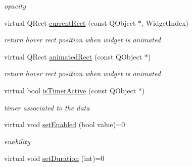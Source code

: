 \begin{DoxyCompactItemize}
\begin{DoxyCompactList}\small\item\em opacity \end{DoxyCompactList}\item 
\mbox{\label{class_menu_base_engine_a678b422c4319b1037f5470cdd4412bcd}} 
virtual Q\+Rect \hyperlink{class_menu_base_engine_a678b422c4319b1037f5470cdd4412bcd}{current\+Rect} (const Q\+Object $\ast$, Widget\+Index)
\begin{DoxyCompactList}\small\item\em return \textquotesingle{}hover\textquotesingle{} rect position when widget is animated \end{DoxyCompactList}\item 
\mbox{\label{class_menu_base_engine_a60d4f198d6c96f5233095996d6f1b3ef}} 
virtual Q\+Rect \hyperlink{class_menu_base_engine_a60d4f198d6c96f5233095996d6f1b3ef}{animated\+Rect} (const Q\+Object $\ast$)
\begin{DoxyCompactList}\small\item\em return \textquotesingle{}hover\textquotesingle{} rect position when widget is animated \end{DoxyCompactList}\item 
\mbox{\label{class_menu_base_engine_a6b93aaade5dadbedc68951940e3f445d}} 
virtual bool \hyperlink{class_menu_base_engine_a6b93aaade5dadbedc68951940e3f445d}{is\+Timer\+Active} (const Q\+Object $\ast$)
\begin{DoxyCompactList}\small\item\em timer associated to the data \end{DoxyCompactList}\item 
\mbox{\label{class_menu_base_engine_a828c16e6e649badaaf3597d9942b6eef}} 
virtual void \hyperlink{class_menu_base_engine_a828c16e6e649badaaf3597d9942b6eef}{set\+Enabled} (bool value)=0
\begin{DoxyCompactList}\small\item\em enability \end{DoxyCompactList}\item 
\mbox{\label{class_menu_base_engine_a9a18c79590d47b6559ff044aa361839c}} 
virtual void \hyperlink{class_menu_base_engine_a9a18c79590d47b6559ff044aa361839c}{set\+Duration} (int)=0

\end{DoxyCompactItemize}
